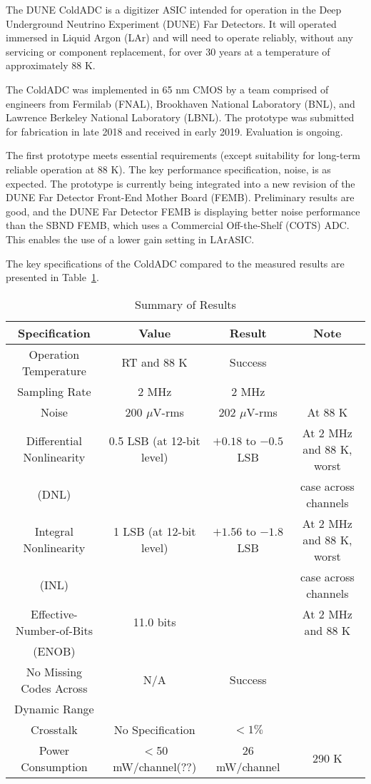 \label{sec:1}

The DUNE ColdADC is a digitizer ASIC intended for operation in the Deep Underground Neutrino Experiment (DUNE) Far Detectors. It will operated immersed in Liquid Argon (LAr) and will need to operate reliably, without any servicing or component replacement, for over 30 years at a temperature of approximately 88 K. 

The ColdADC was implemented in 65 nm CMOS by a team comprised of engineers from Fermilab (FNAL), Brookhaven National Laboratory (BNL), and Lawrence Berkeley National Laboratory (LBNL). The prototype was submitted for fabrication in late 2018 and received in early 2019. Evaluation is ongoing. 

The first prototype meets essential requirements (except suitability for long-term reliable operation at 88 K). The key performance specification, noise, is as expected. The prototype is currently being integrated into a new revision of the DUNE Far Detector Front-End Mother Board (FEMB). Preliminary results are good, and the DUNE Far Detector FEMB is displaying better noise performance than the SBND FEMB, which uses a Commercial Off-the-Shelf (COTS) ADC. This enables the use of a lower gain setting in LArASIC.

The key specifications of the ColdADC compared to the measured results are presented in Table~\ref{tab:coldadc_specs}.

\begin{table}[h]
\centering
\begin{tabular}{|c|c|c|c|}
\hline
\textbf{ Specification } & \textbf{Value} & \textbf{Result} & \textbf{Note}  \\ \hline \hline
Operation Temperature &  RT and 88 K & Success & \\ \hline
Sampling Rate & 2 MHz & 2 MHz & \\ \hline
Noise & 200 $\mu$V-rms & 202 $\mu$V-rms & At 88 K \\ \hline
Differential Nonlinearity & 0.5 LSB (at 12-bit level) & $+0.18$ to $-0.5$ LSB & At 2 MHz and 88 K, worst \\
(DNL) & & & case across channels \\ \hline
Integral Nonlinearity & 1 LSB (at 12-bit level) & $+1.56$ to $-1.8$ LSB & At 2 MHz and 88 K, worst \\
(INL) & & & case across channels \\ \hline
Effective-Number-of-Bits & 11.0 bits & & At 2 MHz and 88 K \\ 
(ENOB) & & & \\ \hline
No Missing Codes Across & N/A & Success & \\ 
Dynamic Range & & & \\ \hline
Crosstalk  & No Specification & $<1\%$ & \\ \hline
Power Consumption & $<$50 mW/channel(??) & 26 mW/channel & 290 K \\ \hline
\end{tabular}
\caption{Summary of Results}
\label{tab:coldadc_specs}
\end{table}
